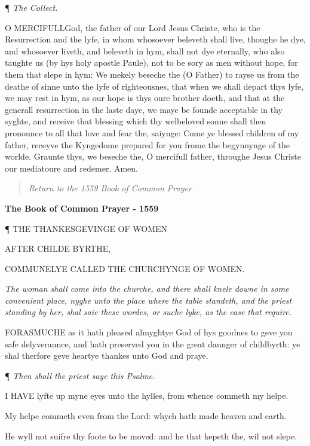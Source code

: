 ¶
\emph{The Collect.}

O
MERCIFULL\textbf{}God, the father of our Lord Jesus Christe, who is the
Resurrection and the lyfe, in whom whosoever beleveth shall live, thoughe
he dye, and whosoever liveth, and beleveth in hym, shall not dye eternally,
who also taughte us (by hys holy apostle Paule), not to be sory as men
without hope, for them that slepe in hym: We mekely beseche the (O Father)
to rayse us from the deathe of sinne unto the lyfe of righteousnes, that
when we shall depart thys lyfe, we may rest in hym, as our hope is thys
oure brother doeth, and that at the generall resurrection in the laste
daye, we maye be founde acceptable in thy syghte, and receive that blessing
which thy welbeloved sonne shall then pronounce to all that love and fear
the, saiynge: Come ye blessed children of my father, receyve the Kyngedome
prepared for you frome the begynnynge of the worlde. Graunte thys, we
beseche the, O mercifull father, throughe Jesus Christe our mediatoure
and redemer. Amen.

\begin{quote}

\emph{Return to the 1559
Book of Common Prayer}

\end{quote}


\textbf{The Book of Common Prayer - 1559}

¶
THE THANKESGEVINGE OF WOMEN

AFTER CHILDE BYRTHE,

COMMUNELYE
CALLED
THE
CHURCHYNGE OF WOMEN.

\emph{The woman shall come into the churche, and there shall
knele downe in some convenient place, nyghe unto the place where the table
standeth, and the priest standing by her, shal saie these wordes, or suche
lyke, as the case that require.}

FORASMUCHE
as it hath pleased almyghtye God of hys goodnes to geve you safe delyveraunce,
and hath preserved you in the great daunger of childbyrth: ye shal therfore
geve heartye thankes unto God and praye.

¶
\emph{Then shall the priest saye this Psalme.}

I
HAVE lyfte up myne eyes unto the hylles, from whence commeth my helpe.

My helpe commeth even from the Lord: whych hath made
heaven and earth.

He wyll not suifre thy foote to be moved: and he that
kepeth the, wil not slepe.


